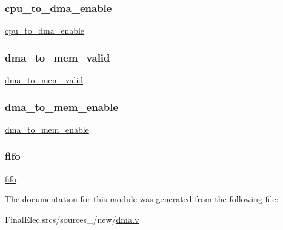 \mbox{\label{enumdma_a8693a930e7a23b7cff186909af9df454}} 
\subsubsection{\texorpdfstring{cpu\+\_\+to\+\_\+dma\+\_\+enable}{cpu\_to\_dma\_enable}}
{\footnotesize\ttfamily \mbox{\hyperlink{enumdma_a8693a930e7a23b7cff186909af9df454}{cpu\+\_\+to\+\_\+dma\+\_\+enable}} \hspace{0.3cm}{\ttfamily [Input]}}

\mbox{\label{enumdma_adebb6c45028d9e8abd6919e9b6dc6492}} 
\subsubsection{\texorpdfstring{dma\+\_\+to\+\_\+mem\+\_\+valid}{dma\_to\_mem\_valid}}
{\footnotesize\ttfamily \mbox{\hyperlink{enumdma_adebb6c45028d9e8abd6919e9b6dc6492}{dma\+\_\+to\+\_\+mem\+\_\+valid}} \hspace{0.3cm}{\ttfamily [Output]}}

\mbox{\label{enumdma_a272e3d64b1ec70497ac14bd358a6e976}} 
\subsubsection{\texorpdfstring{dma\+\_\+to\+\_\+mem\+\_\+enable}{dma\_to\_mem\_enable}}
{\footnotesize\ttfamily \mbox{\hyperlink{enumdma_a272e3d64b1ec70497ac14bd358a6e976}{dma\+\_\+to\+\_\+mem\+\_\+enable}} \hspace{0.3cm}{\ttfamily [Output]}}

\mbox{\label{enumdma_aae0a35ee18bd585d93077404ec59bb29}} 
\subsubsection{\texorpdfstring{fifo}{fifo}}
{\footnotesize\ttfamily \mbox{\hyperlink{enumdma_aae0a35ee18bd585d93077404ec59bb29}{fifo}} \hspace{0.3cm}{\ttfamily [Module Instance]}}



The documentation for this module was generated from the following file\+:\begin{DoxyCompactItemize}
\item 
Final\+Elec.\+srcs/sources\+\_/new/\mbox{\hyperlink{dma_8v}{dma.\+v}}\end{DoxyCompactItemize}
